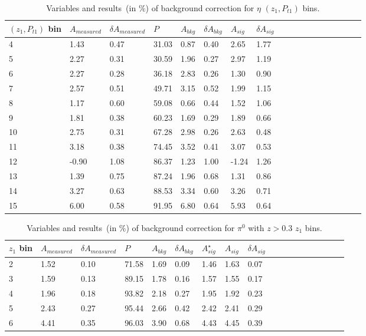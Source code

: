 \begin{table}[H]\footnotesize
\centering
\begin{tabular}{|l|l|l|l|l|l|l|l|l|l|l|l|l|l|l|l|l|l|}
\\ \hline
$(z_{1},P_{t1})$ bin & $A_{measured}$ & $\delta A_{measured}$ & $P$ & $A_{bkg}$ & $\delta A_{bkg}$ &  $ A_{sig}$  & $\delta A_{sig}$ \\ \hline
4 & 1.43 & 0.47 & 31.03 & 0.87 & 0.40 & 2.65  & 1.77 \\ \hline 
5 & 2.27 & 0.31 & 30.59 & 1.96 & 0.27 & 2.97  & 1.19 \\ \hline 
6 & 2.27 & 0.28 & 36.18 & 2.83 & 0.26 & 1.30  & 0.90 \\ \hline 
7 & 2.57 & 0.51 & 49.71 & 3.15 & 0.52 & 1.99  & 1.15 \\ \hline 
8 & 1.17 & 0.60 & 59.08 & 0.66 & 0.44 & 1.52 & 1.06 \\ \hline 
9 & 1.81 & 0.38 & 60.23 & 1.69 & 0.29 & 1.89  & 0.66 \\ \hline 
10 & 2.75 & 0.31 & 67.28 & 2.98 & 0.26 & 2.63  & 0.48 \\ \hline 
11 & 3.18 & 0.38 & 74.45 & 3.52 & 0.41 & 3.07 & 0.53 \\ \hline 
12 & -0.90 & 1.08 & 86.37 & 1.23 & 1.00 & -1.24  & 1.26 \\ \hline 
13 & 1.39 & 0.75 & 87.24 & 1.96 & 0.68 & 1.31  & 0.86 \\ \hline 
14 & 3.27 & 0.63 & 88.53 & 3.34 & 0.60 & 3.26  & 0.71 \\ \hline 
15 & 6.00 & 0.58 & 91.95 & 6.80 & 0.64 & 5.93  & 0.64 \\ \hline 
\end{tabular}
\caption{Variables and results~(in $\%$) of background correction for $\eta$ $(z_1,P_{t1})$ bins.}
\label{tab:etazptbkgcor}
\end{table} 

\begin{table}[H]\footnotesize
\centering
\begin{tabular}{|l|l|l|l|l|l|l|l|l|l|l|l|l|l|l|l|l|l|}
\\ \hline
$z_1$ bin & $A_{measured}$ & $\delta A_{measured}$ & $P$  & $A_{bkg}$ & $\delta A_{bkg}$ & $A_{sig}^{\star}$ & $ A_{sig}$  & $\delta A_{sig}$ \\ \hline
2 & 1.52 & 0.10 & 71.58 & 1.69 & 0.09 & 1.46 & 1.63 & 0.07 \\ \hline 
3 & 1.59 & 0.13 & 89.15 & 1.78 & 0.16 & 1.57 & 1.55 & 0.17 \\ \hline 
4 & 1.96 & 0.18 & 93.82 & 2.18 & 0.27 & 1.95 & 1.92 & 0.23 \\ \hline 
5 & 2.43 & 0.27 & 95.44 & 2.66 & 0.42 & 2.42 & 2.41 & 0.29 \\ \hline 
6 & 4.41 & 0.35 & 96.03 & 3.90 & 0.68 & 4.43 & 4.45 & 0.39 \\ \hline 
 \end{tabular}
\caption{Variables and results~(in $\%$) of background correction for $\pi^0$ with $z>0.3$ $z_1$ bins. }
\label{tab:pi0sinzbkgcor}
\end{table}

